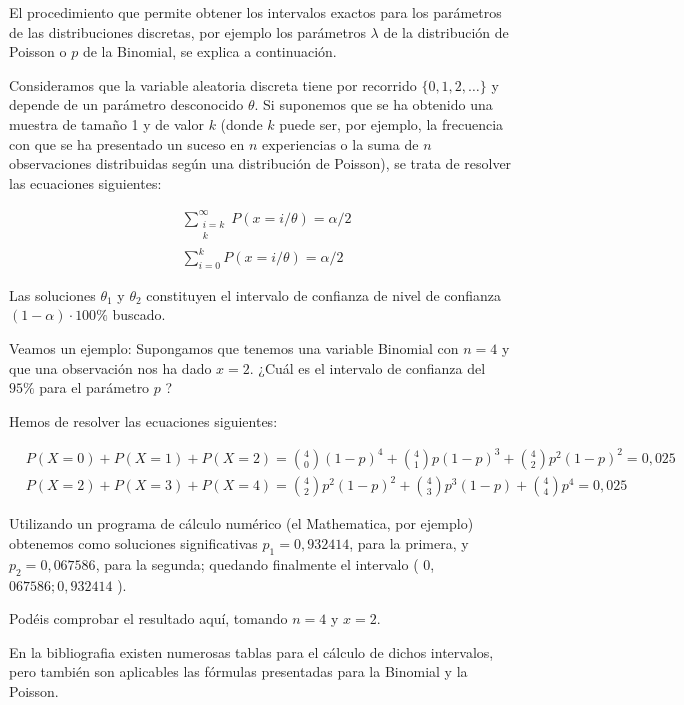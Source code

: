 \documentclass[
]{article}
\begin{document}
El procedimiento que permite obtener los intervalos exactos para los parámetros de las distribuciones discretas, por ejemplo los parámetros \(\lambda\) de la distribución de Poisson o \(p\) de la Binomial, se explica a continuación.

Consideramos que la variable aleatoria discreta tiene por recorrido \(\{0,1,2, \ldots\}\) y depende de un parámetro desconocido \(\theta\). Si suponemos que se ha obtenido una muestra de tamaño 1 y de valor \(k\) (donde \(k\) puede ser, por ejemplo, la frecuencia con que se ha presentado un suceso en \(n\) experiencias o la suma de \(n\) observaciones distribuidas según una distribución de Poisson), se trata de resolver las ecuaciones siguientes:

\[
\begin{aligned}
& \sum_{\substack{i=k \\
k}}^{\infty} P(x=i / \theta)=\alpha / 2 \\
& \sum_{i=0}^{k} P(x=i / \theta)=\alpha / 2
\end{aligned}
\]

Las soluciones \(\theta_{1}\) y \(\theta_{2}\) constituyen el intervalo de confianza de nivel de confianza \((1-\alpha) \cdot 100 \%\) buscado.

Veamos un ejemplo:
Supongamos que tenemos una variable Binomial con \(n=4\) y que una observación nos ha dado \(x=2\). ¿Cuál es el intervalo de confianza del \(95 \%\) para el parámetro \(p\) ?

Hemos de resolver las ecuaciones siguientes:

\[
\begin{aligned}
& P(X=0)+P(X=1)+P(X=2)=\binom{4}{0}(1-p)^{4}+\binom{4}{1} p(1-p)^{3}+\binom{4}{2} p^{2}(1-p)^{2}=0,025 \\
& P(X=2)+P(X=3)+P(X=4)=\binom{4}{2} p^{2}(1-p)^{2}+\binom{4}{3} p^{3}(1-p)+\binom{4}{4} p^{4}=0,025
\end{aligned}
\]

Utilizando un programa de cálculo numérico (el Mathematica, por ejemplo) obtenemos como soluciones significativas \(p_{1}=0,932414\), para la primera, y \(p_{2}=0,067586\), para la segunda; quedando finalmente el intervalo ( 0,\(067586 ; 0,932414\) ).

Podéis comprobar el resultado aquí, tomando \(n=4\) y \(x=2\).

En la bibliografia existen numerosas tablas para el cálculo de dichos intervalos, pero también son aplicables las fórmulas presentadas para la Binomial y la Poisson.
\end{document}
